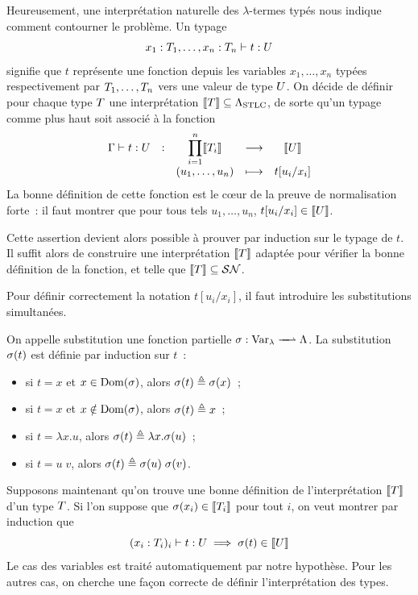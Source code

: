 Heureusement, une interprétation naturelle des $\lambda$-termes typés nous
indique comment contourner le problème. Un typage
\[x_1:T_1,\ldots,x_n : T_n\mathrel{\vdash} t : U\]
signifie que $t$ représente une fonction depuis les variables $x_1,\ldots,x_n$
typées respectivement par $T_1,\ldots,T_n$ vers une valeur de type
$U$. On décide de définir pour chaque type $T$ une interprétation
$\llbracket T\rrbracket\subseteq\Lambda_{\mathrm{STLC}}$, de sorte qu'un typage comme plus haut soit
associé à la fonction
\[\makeFun{\varCG\tyR t : \varTypB}
          {\prod_{i = 1}^n\semT{\varTypA_i}}{\semT{\varTypB}}
          {(u_1,\ldots,u_n)}{t[u_i/x_i]}\]
La bonne définition de cette fonction est le c\oe ur de la preuve de
normalisation forte~: il faut montrer que pour tous tels $u_1,\ldots,u_n$,
$t[u_i/x_i] \in \llbracket U\rrbracket$.

Cette assertion devient alors possible à prouver par induction sur le typage de
$t$. Il suffit alors de construire une interprétation $\llbracket T\rrbracket$ adaptée
pour vérifier la bonne définition de la fonction, et telle que
$\llbracket T\rrbracket\subseteq\mathcal{SN}$.

Pour définir correctement la notation $t[u_i/x_i]$, il faut introduire les
substitutions simultanées.

\begin{definition}
  On appelle substitution une fonction partielle
  $\makeFunNamePartial{\subSimul}{\lamVar}{\lamSet}$. La substitution
  $\sigma(t)$ est définie par induction sur $t$~:
  \begin{itemize}
  \item si $t = x$ et $x \in \operatorname{Dom}(\sigma)$, alors
    $\sigma(t) \triangleq \sigma(x)$~;
  \item si $t = x$ et $x\notin\operatorname{Dom}(\sigma)$, alors
    $\sigma(t)\triangleq x$~;
  \item si $t = \lambda x.u$, alors
    $\sigma(t)\triangleq\lambda x.\sigma(u)$~;
  \item si $t = u\;v$, alors
    $\sigma(t)\triangleq \sigma(u)\;\sigma(v)$.
  \end{itemize}
\end{definition}

Supposons maintenant qu'on trouve une bonne définition de l'interprétation
$\llbracket T\rrbracket$ d'un type $T$. Si l'on suppose que
$\sigma(x_i) \in \llbracket T_i\rrbracket$ pour tout $i$, on veut montrer par
induction que
\[(x_i : T_i)_i\mathrel{\vdash} t : U \implies \sigma(t) \in
\llbracket U\rrbracket\]
Le cas des variables est traité automatiquement par notre hypothèse. Pour les
autres cas, on cherche une façon correcte de définir l'interprétation des types.

